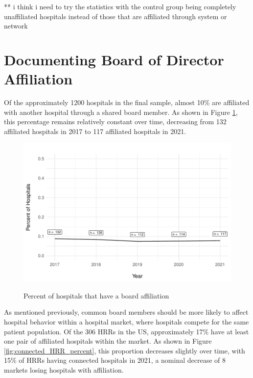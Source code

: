 \documentclass[12pt]{article}
\begin{document}
    ** i think i need to try the statistics with the control group being completely unaffiliated hospitals instead of those that are affiliated through system or network


    \section{Documenting Board of Director Affiliation}


    Of the approximately 1200 hospitals in the final sample, almost 10\% are affiliated with another hospital through a shared board member. As shown in Figure \ref{fig:connected_percent}, this percentage remains relatively constant over time, decreasing from 132 affiliated hospitals in 2017 to 117 affiliated hospitals in 2021. 

    \begin{figure}[ht!]
        \centering
        \caption{Percent of hospitals that have a board affiliation}
        \includegraphics[width=.8\textwidth]{Objects/connected_percent.pdf}
        \label{fig:connected_percent}
    \end{figure}

    As mentioned previously, common board members should be more likely to affect hospital behavior within a hospital market, where hospitals compete for the same patient population. Of the 306 HRRs in the US, approximately 17\% have at least one pair of affiliated hospitals within the market. As shown in Figure \ref{fig:connected_HRR_percent}, this proportion decreases slightly over time, with 15\% of HRRs having connected hospitals in 2021, a nominal decrease of 8 markets losing hospitals with affiliation.  
\end{document}
